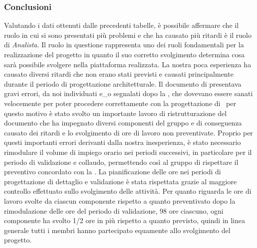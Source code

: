 \subsubsection{Conclusioni}
Valutando i dati ottenuti dalle precedenti tabelle, è possibile affermare che il ruolo in cui si sono presentati più problemi e che ha causato più ritardi è il ruolo di \textit{Analista}.
Il ruolo in questione rappresenta uno dei ruoli fondamentali per la realizzazione del progetto in quanto il suo corretto svolgimento determina cosa sarà possibile svolgere nella piattaforma realizzata. La nostra poca esperienza ha causato diversi ritardi che non erano stati previsti e causati principalmente durante il periodo di progettazione architetturale. Il documento di \AdRv{} presentava gravi errori, da noi individuati e\_o segnalati dopo la , che dovevano essere sanati velocemente per poter procedere correttamente con la progettazione di \NomeProgetto\, per questo motivo è stato svolto un importante lavoro di ristrutturazione del documento che ha impegnato diversi componenti del gruppo e di conseguenza causato dei ritardi e lo svolgimento di ore di lavoro non preventivate. Proprio per questi importanti errori derivanti dalla nostra inesperienza, è stato necessario rimodulare il volume di impiego orario nei periodi successivi, in particolare per il periodo di validazione e collaudo, permettendo così al gruppo di rispettare il preventivo concordato con la . 
La pianificazione delle ore nei periodi di progettazione di dettaglio e validazione è stata rispettata grazie al maggiore controllo effettuato sullo svolgimento delle attività. Per quanto riguarda le ore di lavoro svolte da ciascun componente rispetto a quanto preventivato dopo la rimodulazione delle ore del periodo di validazione, 98 ore ciascuno, ogni componente ha svolto 1/2 ore in più rispetto a quanto previsto, quindi in linea generale tutti i membri hanno partecipato equamente allo svolgimento del progetto.
